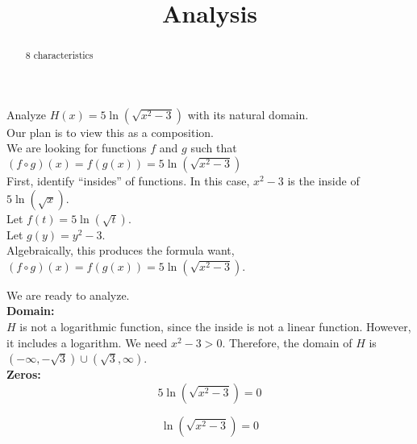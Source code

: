 \documentclass{ximera}
\title{Analysis}
\begin{document}
\begin{abstract}
8 characteristics
\end{abstract}
\maketitle












Analyze $H(x) = 5 \ln(\sqrt{x^2-3})$ with its natural domain. \\

Our plan is to view this as a composition. \\






We are looking for functions $f$ and $g$ such that $(f \circ g)(x) = f(g(x)) = 5 \ln(\sqrt{x^2-3})$ \\


First, identify ``insides'' of functions.  In this case, $x^2 - 3$ is the inside of $5 \ln(\sqrt{x})$. \\




Let $f(t) = 5 \ln(\sqrt{t})$. \\

Let $g(y) = y^2 - 3$. \\


Algebraically, this produces the formula want, $(f \circ g)(x) = f(g(x)) = 5 \ln(\sqrt{x^2-3})$.



We are ready to analyze. \\




\textbf{\textcolor{blue!55!black}{Domain:}} \\


$H$ is not a logarithmic function, since the inside is not a linear function.  However, it includes a logarithm. We need $x^2-3 > 0$.  Therefore, the domain of $H$ is $(-\infty, -\sqrt{3}) \cup (\sqrt{3}, \infty)$. \\



\textbf{\textcolor{blue!55!black}{Zeros:}} \\




\[
5 \ln(\sqrt{x^2-3}) = 0
\]


\[
\ln(\sqrt{x^2-3}) = 0
\]
\end{document}
